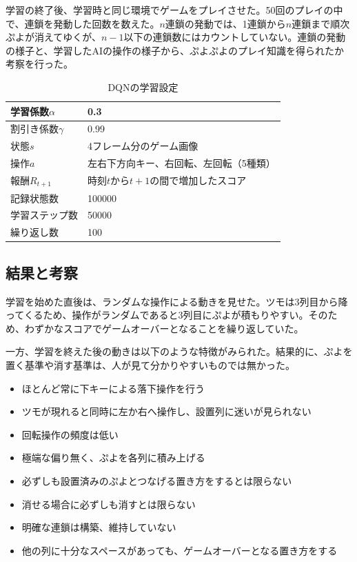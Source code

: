 \documentclass[12pt]{jarticle}
\begin{document}
学習の終了後、学習時と同じ環境でゲームをプレイさせた。50回のプレイの中で、連鎖を発動した回数を数えた。$n$連鎖の発動では、1連鎖から$n$連鎖まで順次ぷよが消えてゆくが、$n-1$以下の連鎖数にはカウントしていない。連鎖の発動の様子と、学習したAIの操作の様子から、ぷよぷよのプレイ知識を得られたか考察を行った。

\begin{table}[htb]
\begin{center}
\caption{DQNの学習設定} \label{tab:dqn_conf}
\begin{tabular}{|l|l|} \hline
  学習係数$\alpha$ & 0.3\\ \hline
  割引き係数$\gamma$ & 0.99\\ \hline
  状態$s$ & 4フレーム分のゲーム画像\\ \hline
  操作$a$ & 左右下方向キー、右回転、左回転（5種類）\\ \hline
  報酬$R_{t+1}$ & 時刻$t$から$t+1$の間で増加したスコア\\ \hline
  記録状態数 & 100000\\ \hline
  学習ステップ数 & 50000\\ \hline
  繰り返し数 & 100\\ \hline
\end{tabular}
\end{center}
\end{table}

\subsection{結果と考察}
学習を始めた直後は、ランダムな操作による動きを見せた。ツモは3列目から降ってくるため、操作がランダムであると3列目にぷよが積もりやすい。そのため、わずかなスコアでゲームオーバーとなることを繰り返していた。

一方、学習を終えた後の動きは以下のような特徴がみられた。結果的に、ぷよを置く基準や消す基準は、人が見て分かりやすいものでは無かった。
\begin{itemize}
  \item ほとんど常に下キーによる落下操作を行う
  \item ツモが現れると同時に左か右へ操作し、設置列に迷いが見られない
  \item 回転操作の頻度は低い
  \item 極端な偏り無く、ぷよを各列に積み上げる
  \item 必ずしも設置済みのぷよとつなげる置き方をするとは限らない
  \item 消せる場合に必ずしも消すとは限らない
  \item 明確な連鎖は構築、維持していない
  \item 他の列に十分なスペースがあっても、ゲームオーバーとなる置き方をする
\end{itemize}
\end{document}
